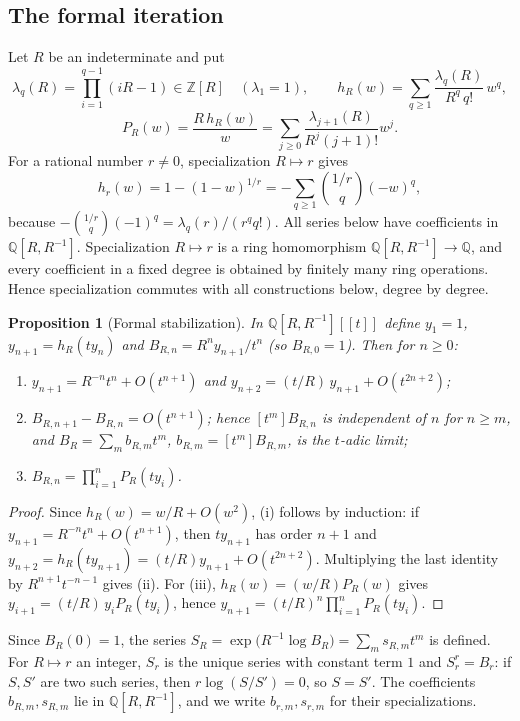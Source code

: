 \documentclass[11pt,reqno]{amsart}
\newtheorem{proposition}[theorem]{Proposition}
\theoremstyle{definition}
\theoremstyle{remark}
\theoremstyle{plain}
\newcommand{\Z}{\mathbb Z}
\newcommand{\Q}{\mathbb Q}
\begin{document}
\subsection{The formal iteration}
Let $R$ be an indeterminate and put
\[
\lambda_q(R)=\prod_{i=1}^{q-1}(iR-1)\in\Z[R]\quad(\lambda_1=1),\qquad
h_R(w)=\sum_{q\ge1}\frac{\lambda_q(R)}{R^q\,q!}\,w^q,
\]
\[
P_R(w)=\frac{R\,h_R(w)}{w}=\sum_{j\ge0}\frac{\lambda_{j+1}(R)}{R^j(j+1)!}w^j .
\]
For a rational number $r\ne0$, specialization $R\mapsto r$ gives
\[
h_r(w)=1-(1-w)^{1/r}=-\sum_{q\ge1}\binom{1/r}{q}(-w)^q,
\]
because $-\binom{1/r}{q}(-1)^q=\lambda_q(r)/(r^qq!)$. All series below have coefficients in $\Q[R,R^{-1}]$. Specialization $R\mapsto r$ is a ring homomorphism $\Q[R,R^{-1}]\to\Q$, and every coefficient in a fixed degree is obtained by finitely many ring operations. Hence specialization commutes with all constructions below, degree by degree.

\begin{proposition}[Formal stabilization]\label{prop:formal}
In $\Q[R,R^{-1}][[t]]$ define $y_1=1$, $y_{n+1}=h_R(ty_n)$ and $B_{R,n}=R^n y_{n+1}/t^n$ (so $B_{R,0}=1$). Then for $n\ge0$:
\begin{enumerate}[label=\textup{(\roman*)}]
\item $y_{n+1}=R^{-n}t^n+O(t^{n+1})$ and $y_{n+2}=(t/R)\,y_{n+1}+O(t^{2n+2})$;
\item $B_{R,n+1}-B_{R,n}=O(t^{n+1})$; hence $[t^m]B_{R,n}$ is independent of $n$ for $n\ge m$, and $B_R=\sum_m b_{R,m}t^m$, $b_{R,m}=[t^m]B_{R,m}$, is the $t$-adic limit;
\item $B_{R,n}=\prod_{i=1}^nP_R(ty_i)$.
\end{enumerate}
\end{proposition}

\begin{proof}
Since $h_R(w)=w/R+O(w^2)$, (i) follows by induction: if $y_{n+1}=R^{-n}t^n+O(t^{n+1})$, then $ty_{n+1}$ has order $n+1$ and $y_{n+2}=h_R(ty_{n+1})=(t/R)y_{n+1}+O(t^{2n+2})$. Multiplying the last identity by $R^{n+1}t^{-n-1}$ gives (ii). For (iii), $h_R(w)=(w/R)P_R(w)$ gives $y_{i+1}=(t/R)\,y_iP_R(ty_i)$, hence $y_{n+1}=(t/R)^n\prod_{i=1}^nP_R(ty_i)$.
\end{proof}

Since $B_R(0)=1$, the series $S_R=\exp\bigl(R^{-1}\log B_R\bigr)=\sum_m s_{R,m}t^m$ is defined. For $R\mapsto r$ an integer, $S_r$ is the unique series with constant term $1$ and $S_r^r=B_r$: if $S,S'$ are two such series, then $r\log(S/S')=0$, so $S=S'$. The coefficients $b_{R,m},s_{R,m}$ lie in $\Q[R,R^{-1}]$, and we write $b_{r,m},s_{r,m}$ for their specializations.
\end{document}

